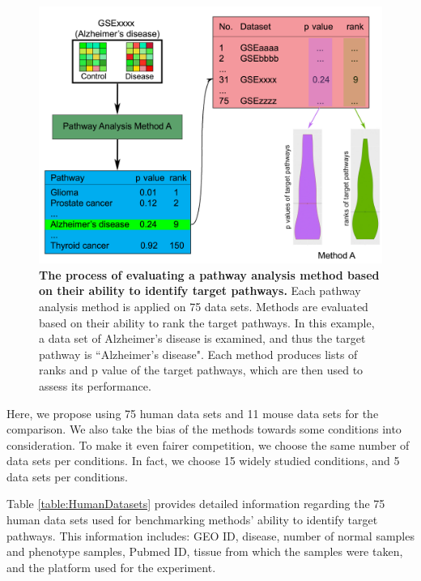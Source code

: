 \begin{figure}
\includegraphics[width=0.8\linewidth]{Figures/Fig1}
\caption{\textbf{The process of evaluating a pathway analysis method based on their ability to identify target pathways.} Each pathway analysis method is applied on 75 data sets. Methods are evaluated based on their ability to rank the target pathways. In this example, a data set of Alzheimer's disease is examined, and thus the target pathway is ``Alzheimer's disease". Each method produces lists of ranks and p value of the target pathways, which are then used to assess its performance.}
\label{workflow}
\end{figure}

Here, we propose using 75 human data sets and 11 mouse data sets for the comparison. We also take the bias of the methods towards some conditions into consideration. To make it even fairer competition, we choose the same number of data sets per conditions. In fact, we choose 15 widely studied conditions, and 5 data sets per conditions.

Table \ref{table:HumanDatasets} provides detailed information regarding the 75 human data sets used for benchmarking methods' ability to identify target pathways. This information includes: GEO ID, disease, number of normal samples and phenotype samples,  Pubmed ID, tissue from which the samples were taken, and the platform used for the experiment.

